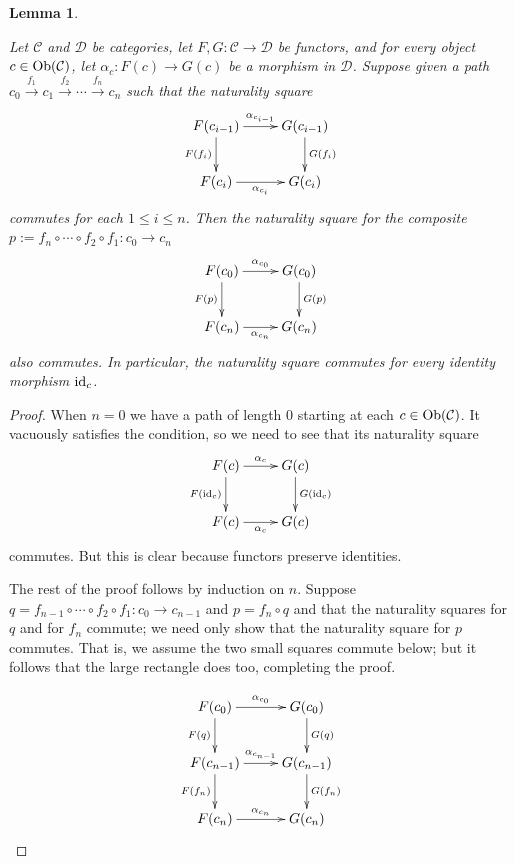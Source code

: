 \documentclass{book}
\def\tn{\textnormal}
\def\mc{\mathcal}
\def\Ob{\tn{Ob}}
\def\to{\rightarrow}
\def\taking{\colon}
\newcommand{\To}[1]{\xrightarrow{#1}}
\def\id{\tn{id}}
\def\mcC{\mc{C}}
\def\mcD{\mc{D}}
\newtheorem{lemma}[subsubsection]{Lemma}
\theoremstyle{remark}
\theoremstyle{definition}
\begin{document}
\begin{lemma}\label{lemma:generators for nattrans}

Let $\mcC$ and $\mcD$ be categories, let $F,G\taking\mcC\to\mcD$ be functors, and for every object $c\in\Ob(\mcC)$, let $\alpha_c\taking F(c)\to G(c)$ be a morphism in $\mcD$. Suppose given a path $c_0\To{f_1}c_1\To{f_2}\cdots\To{f_n} c_n$ such that the naturality square 
$$
\xymatrix{F(c_{i-1})\ar[d]_{F(f_i)}\ar[r]^{\alpha_{c_{i-1}}}&G(c_{i-1})\ar[d]^{G(f_i)}\\F(c_i)\ar[r]_{\alpha_{c_i}}&G(c_i)
}
$$
commutes for each $1\leq i\leq n$. Then the naturality square for the composite $p:=f_n\circ\cdots\circ f_2\circ f_1\taking c_0\to c_n$ 
$$\xymatrix{F(c_0)\ar[r]^{\alpha_{c_0}}\ar[d]_{F(p)}&G(c_0)\ar[d]^{G(p)}\\F(c_n)\ar[r]_{\alpha_{c_n}}&G(c_n)}
$$
also commutes. In particular, the naturality square commutes for every identity morphism $\id_c$.

\end{lemma}

\begin{proof}

When $n=0$ we have a path of length 0 starting at each $c\in\Ob(\mcC)$. It vacuously satisfies the condition, so we need to see that its naturality square 
$$\xymatrix{F(c)\ar[r]^{\alpha_c}\ar[d]_{F(\id_c)}&G(c)\ar[d]^{G(\id_c)}\\F(c)\ar[r]_{\alpha_c}&G(c)}
$$
commutes. But this is clear because functors preserve identities. 

The rest of the proof follows by induction on $n$. Suppose $q=f_{n-1}\circ\cdots\circ f_2\circ f_1\taking c_0\to c_{n-1}$ and $p=f_n\circ q$ and that the naturality squares for $q$ and for $f_n$ commute; we need only show that the naturality square for $p$ commutes. That is, we assume the two small squares commute below; but it follows that the large rectangle does too, completing the proof.

$$
\xymatrix{
F(c_0)\ar[r]^{\alpha_{c_0}}\ar[d]_{F(q)}&G(c_0)\ar[d]^{G(q)}\\
F(c_{n-1})\ar[r]^{\alpha_{c_{n-1}}}\ar[d]_{F(f_n)}&G(c_{n-1})\ar[d]^{G(f_n)}\\
F(c_n)\ar[r]^{\alpha_{c_n}}&G(c_n)
}
$$

\end{proof}
\end{document}
